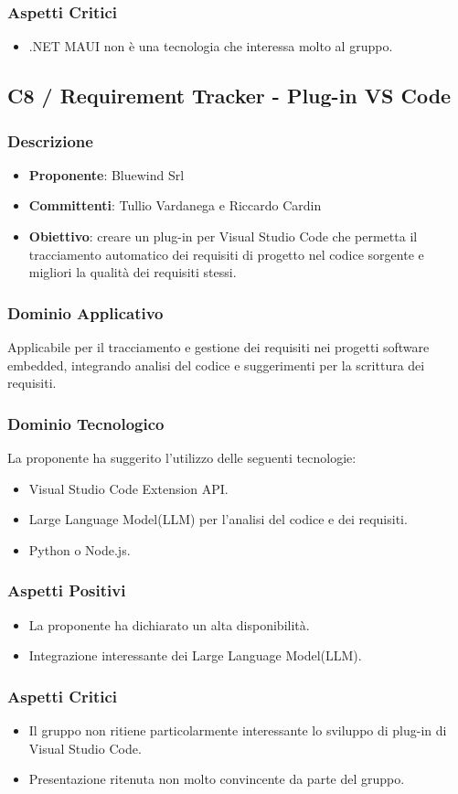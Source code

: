 \documentclass[a4paper, 12pt]{article}
\begin{document}
\subsubsection{Aspetti Critici}
\begin{itemize}
    \item .NET MAUI non è una tecnologia che interessa molto al gruppo.
\end{itemize}

\subsection{C8 / Requirement Tracker - Plug-in VS Code}
\subsubsection{Descrizione}
\begin{itemize}
    \item \textbf{Proponente}: Bluewind Srl
    \item \textbf{Committenti}: Tullio Vardanega e Riccardo Cardin
    \item \textbf{Obiettivo}: creare un plug-in per Visual Studio Code che permetta il tracciamento automatico dei requisiti di progetto nel codice sorgente e migliori la qualità dei requisiti stessi.
\end{itemize}

\subsubsection{Dominio Applicativo}
Applicabile per il tracciamento e gestione dei requisiti nei progetti software embedded, integrando analisi del codice e suggerimenti per la scrittura dei requisiti.

\subsubsection{Dominio Tecnologico}
La proponente ha suggerito l’utilizzo delle seguenti tecnologie:
\begin{itemize}
    \item Visual Studio Code Extension API.
    \item Large Language Model(LLM) per l'analisi del codice e dei requisiti.
    \item Python o Node.js.
\end{itemize}

\subsubsection{Aspetti Positivi}
\begin{itemize}
    \item La proponente ha dichiarato un alta disponibilità.
    \item Integrazione interessante dei Large Language Model(LLM).
\end{itemize}

\subsubsection{Aspetti Critici}
\begin{itemize}
    \item Il gruppo non ritiene particolarmente interessante lo sviluppo di plug-in di Visual Studio Code.
    \item Presentazione ritenuta non molto convincente da parte del gruppo.
\end{itemize}
\end{document}
